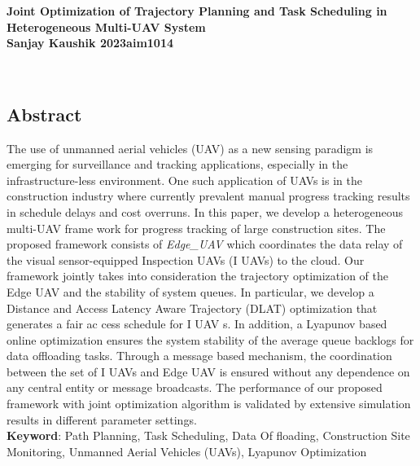 \documentclass[a0,portrait ] {article}
\begin{document}
\begin{center}

\centering \large \textbf{Joint Optimization of Trajectory Planning and Task Scheduling in \\ Heterogeneous Multi-UAV System \\}
\vspace{1cm}
\centering \textbf{ Sanjay Kaushik 2023aim1014\\}
\end{center}
\\
\begin{multicols}{2}
\vspace{1cm}
\section*{Abstract} \label{sec:1}
The use of unmanned aerial vehicles (UAV) as a new sensing paradigm is emerging for surveillance and tracking applications, especially in the infrastructure-less environment. One such application of UAVs is in the construction industry where currently prevalent manual progress tracking results in schedule delays and cost overruns. In this paper, we develop a heterogeneous multi-UAV frame work for progress tracking of large construction sites. The proposed framework consists of \emph{Edge\_UAV} which coordinates the data relay of the visual sensor-equipped Inspection UAVs (I UAVs) to the cloud. Our framework jointly takes into consideration the trajectory optimization of the Edge UAV and the stability of system queues. In particular, we develop a Distance and Access Latency Aware Trajectory (DLAT) optimization that generates a fair ac cess schedule for I UAV s. In addition, a Lyapunov based online optimization ensures the system stability of the average queue backlogs for data offloading tasks. Through a message based mechanism, the coordination between the set of I UAVs and Edge UAV is ensured without any dependence on any central entity or message broadcasts. The performance of our proposed framework with joint optimization algorithm is validated by extensive simulation results in different parameter settings.\\
\hspace{1cm} \textbf{Keyword}: Path Planning, Task Scheduling, Data Of floading, Construction Site Monitoring, Unmanned Aerial Vehicles (UAVs), Lyapunov Optimization



\end{multicols}
\end{document}
